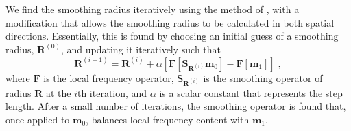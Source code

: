     We find the smoothing radius iteratively using the method of \cite{locfreq}, with a modification that allows the smoothing radius to be calculated in both spatial directions. 
Essentially, this is found by choosing an initial guess of a smoothing radius, $\mathbf{R}^{(0)}$, and updating it iteratively such that 
    \begin{equation}
        \label{eq:it}
        \mathbf{R}^{(i+1)} = \mathbf{R}^{(i)}+ \alpha \left [ \mathbf{F}[\mathbf{S}_{\mathbf{R}^{(i)}} \mathbf{m}_0] - \mathbf{F}[\mathbf{m}_1] \right ]\;,
    \end{equation}
    where $\mathbf{F}$ is the local frequency operator, $\mathbf{S}_{\mathbf{R}^{(i)}}$ is the smoothing operator of radius $\mathbf{R}$ at the $i$th iteration, and $\alpha$ is a scalar constant that represents the step length.
    After a small number of iterations, the smoothing operator is found that, once applied to $\mathbf{m}_0$, balances local frequency content with $\mathbf{m}_1$.


